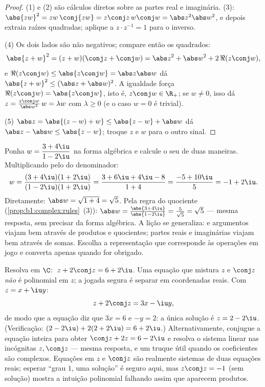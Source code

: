 \begin{proof}
(1) e (2) são cálculos diretos sobre as partes real e imaginária. (3):
$\abs{zw}^2 = zw\,\conj{zw} = z\conj z\, w \conj w = \abs z^2 \abs
w^2$, e depois extraia raízes quadradas; aplique a $z \cdot z^{-1} = 1$ para o
inverso.

(4) Os dois lados são não negativos; compare então os quadrados:
\[
\abs{z+w}^2 = (z+w)(\conj z + \conj w)
= \abs z^2 + \abs w^2 + 2\,\Re(z \conj w),
\]
e $\Re(z\conj w) \leq \abs{z \conj w} = \abs z \abs w$ dá
$\abs{z+w}^2 \leq (\abs z + \abs w)^2$. A igualdade força $\Re(z \conj
w) = \abs{z \conj w}$, isto é, $z \conj w \in \R_+$; se $w \neq 0$, isso
dá $z = \frac{z\conj w}{\abs w^2}\, w = \lambda w$ com $\lambda
\geq 0$ (e o caso $w = 0$ é trivial).

(5) $\abs z = \abs{(z - w) + w} \leq \abs{z-w} + \abs w$ dá $\abs z
- \abs w \leq \abs{z - w}$; troque $z$ e $w$ para o outro sinal.
\end{proof}

\begin{example}\label{ex:b1:complex:workout}
Ponha $w = \dfrac{3 + 4\iu}{1 - 2\iu}$ na forma algébrica e calcule
o seu  de duas maneiras. Multiplicando pelo  do
denominador:
\[
w = \frac{(3 + 4\iu)(1 + 2\iu)}{(1 - 2\iu)(1 + 2\iu)}
= \frac{3 + 6\iu + 4\iu - 8}{1 + 4}
= \frac{-5 + 10\iu}{5} = -1 + 2\iu .
\]
Diretamente: $\abs w = \sqrt{1 + 4} = \sqrt5$. Pela regra do quociente
(\cref{prop:b1:complex:rules}~(3)): $\abs w = \frac{\abs{3 +
4\iu}}{\abs{1 - 2\iu}} = \frac5{\sqrt5} = \sqrt5$ --- mesma resposta,
sem precisar da forma algébrica. A lição se generaliza:  e
argumentos viajam bem através de produtos e quocientes; partes reais e
imaginárias viajam bem através de somas. Escolha a representação que
corresponde às operações em jogo e converta apenas quando for obrigado.
\end{example}

\begin{example}\label{ex:b1:complex:conjeq}
Resolva em $\C$: $\;z + 2\conj z = 6 + 2\iu$. Uma equação que mistura $z$
e $\conj z$ \emph{não} é polinomial em $z$; a jogada segura
é separar em coordenadas reais. Com $z = x + \iu y$:
\[
z + 2\conj z = 3x - \iu y ,
\]
de modo que a equação diz que $3x = 6$ e $-y = 2$: a única solução
é $z = 2 - 2\iu$. (Verificação: $(2 - 2\iu) + 2(2 + 2\iu) = 6 +
2\iu$.) Alternativamente, conjugue a equação inteira para obter
$\conj z + 2z = 6 - 2\iu$ e resolva o sistema linear nas
incógnitas $z, \conj z$ --- mesma resposta, e um truque útil quando
os coeficientes são complexos. Equações em $z$ e $\conj z$ são
realmente sistemas de duas equações reais; esperar ``grau $1$, uma
solução'' é seguro aqui, mas $z\conj z = -1$ (sem solução) mostra
a intuição polinomial falhando assim que aparecem produtos.
\end{example}

